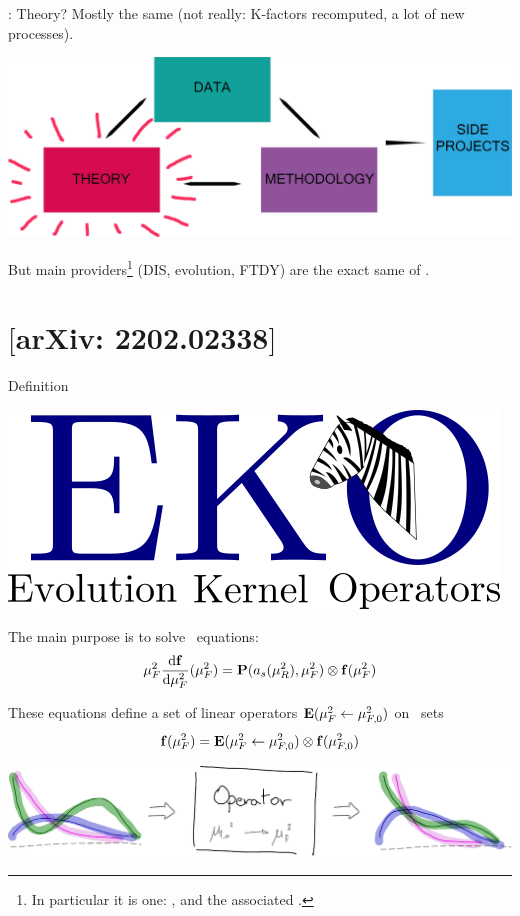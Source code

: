 \documentclass[9pt]{beamer}
\providecommand{\iRef}[1]{{\color{mLightGreen}\small $[$#1$]$}}
\begin{document}
\begin{frame}{: Theory?}
    Mostly the same (not really: K-factors recomputed, a lot of new processes).
    \vspace*{10pt}
    \begin{center}
        \includegraphics[width=0.7\linewidth]{organization}
    \end{center}
    \vspace*{10pt}
    But main providers\footnote{
        In particular it is one: \apfel, and the associated \apfelcomb.
    } (DIS, evolution, FTDY) are the exact same of .
\end{frame}

\section{\eko{} \iRef{arXiv: 2202.02338}}

\begin{frame}{\eko{} Definition}
    \begin{center}
            \includegraphics[width=.35\linewidth]{eko}
    \end{center}

    The main purpose is to solve \textbf{\dglap}\ equations:
    \begin{equation*}
            \muF^2 \dv{\vb f}{\muF^2}{}(\muF^2) = \vb P (a_s(\muR^2),\muF^2) \otimes \vb f(\muF^2)
    \end{equation*}

    These equations define a set of linear operators $\vb E(\mu_F^2 \leftarrow
    \mu_{F,0}^2)$ on \textbf{\pdf}\ sets
    \begin{equation*}
            \vb f(\mu_F^2) = \vb E(\mu_F^2 \leftarrow \mu_{F,0}^2) \otimes \vb f(\mu_{F,0}^2)
    \end{equation*}

    \vspace*{15pt}
    \begin{center}
            \includegraphics[width=0.7\linewidth]{ev-op}
    \end{center}
\end{frame}
\end{document}
